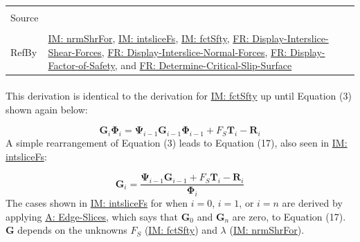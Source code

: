 \documentclass[12pt]{article}
\begin{document}
\begin{minipage}{\textwidth}
\begin{tabular}{>{\raggedright}p{}>{\raggedright\arraybackslash}p{}}
\\ \midrule \\
Source & \cite{chen2005}
         
\\ \midrule \\
RefBy & \hyperref[IM:nrmShrFor]{IM: nrmShrFor}, \hyperref[IM:intsliceFs]{IM: intsliceFs}, \hyperref[IM:fctSfty]{IM: fctSfty}, \hyperref[displayShear]{FR: Display-Interslice-Shear-Forces}, \hyperref[displayNormal]{FR: Display-Interslice-Normal-Forces}, \hyperref[displayFS]{FR: Display-Factor-of-Safety}, and \hyperref[determineCritSlip]{FR: Determine-Critical-Slip-Surface}
        
\\ \bottomrule
\end{tabular}
\end{minipage}
\paragraph{}
\label{IM:intsliceFsDeriv}
This derivation is identical to the derivation for \hyperref[IM:fctSfty]{IM: fctSfty} up until Equation (3) shown again below:

\begin{displaymath}
{\mathbf{G}}_{i} {\mathbf{Φ}}_{i}={\mathbf{Ψ}}_{i-1} {\mathbf{G}}_{i-1} {\mathbf{Φ}}_{i-1}+{F_{S}} {\mathbf{T}}_{i}-{\mathbf{R}}_{i}
\end{displaymath}
A simple rearrangement of Equation (3) leads to Equation (17), also seen in \hyperref[IM:intsliceFs]{IM: intsliceFs}:

\begin{displaymath}
{\mathbf{G}}_{i}=\frac{{\mathbf{Ψ}}_{i-1} {\mathbf{G}}_{i-1}+{F_{S}} {\mathbf{T}}_{i}-{\mathbf{R}}_{i}}{{\mathbf{Φ}}_{i}}
\end{displaymath}
The cases shown in \hyperref[IM:intsliceFs]{IM: intsliceFs} for when $i=0$, $i=1$, or $i=n$ are derived by applying \hyperref[assumpES]{A: Edge-Slices}, which says that ${\mathbf{G}}_{0}$ and ${\mathbf{G}}_{n}$ are zero, to Equation (17). $\mathbf{G}$ depends on the unknowns ${F_{S}}$ (\hyperref[IM:fctSfty]{IM: fctSfty}) and $λ$ (\hyperref[IM:nrmShrFor]{IM: nrmShrFor}).
\end{document}
